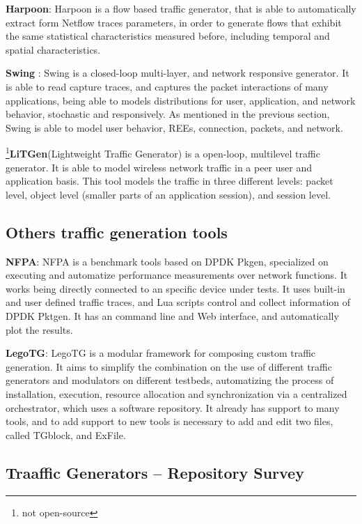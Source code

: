 \textbf{Harpoon}\cite{harpoon-paper}: Harpoon is a flow based traffic generator, that is able to 
automatically extract form Netflow traces parameters, in order to generate flows that exhibit the same statistical characteristics measured before, including temporal and spatial characteristics. 

\textbf{Swing}\cite{swing-paper} \cite{web-swing}: Swing is a closed-loop multi-layer, and network responsive generator. It is able to read capture traces, and captures the packet interactions of many applications, being able to models distributions for user, application, and network behavior, stochastic and responsively. As mentioned in the previous section, Swing is able to model user behavior, REEs, connection, packets, and network. 


\footnote{not open-source}\textbf{LiTGen}(Lightweight Traffic Generator)\cite{litgen-paper} is a open-loop, multilevel traffic generator. It is able to model wireless network traffic in a peer user and application basis. This tool models the traffic in three different levels: packet level, object level (smaller parts of an application session), and session level.


\subsection{Others traffic generation tools}


\textbf{NFPA}\cite{nfpa-paper}: NFPA is a benchmark tools based on DPDK Pkgen, specialized on executing and automatize performance measurements over network functions. It works being directly connected to an specific device under tests. It uses built-in and user defined traffic traces, and Lua scripts control and collect information of DPDK Pktgen. It has an command line and Web interface, and automatically plot the results.

\textbf{LegoTG}\cite{legotg-paper}: LegoTG is a modular framework for composing custom traffic generation. It aims to simplify the combination on the use of different traffic generators and modulators on different testbeds, automatizing the process of installation, execution, resource allocation and synchronization via a centralized orchestrator, which uses a software repository. It already has support to many tools, and to add support to new tools is necessary to add and edit two files, called TGblock, and ExFile.


\subsection{Traaffic Generators -- Repository Survey}

